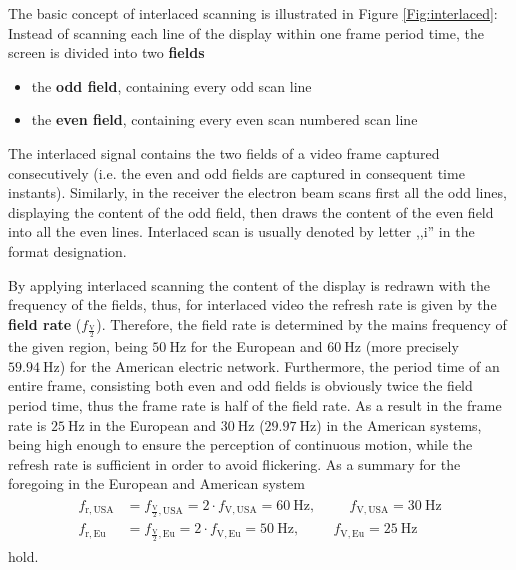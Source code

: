 The basic concept of interlaced scanning is illustrated in Figure \ref{Fig:interlaced}:
Instead of scanning each line of the display within one frame period time, the screen is divided into two \textbf{fields}
\begin{itemize}
\item the \textbf{odd field}, containing every odd scan line 
\item the \textbf{even field}, containing every even scan numbered scan line
\end{itemize}
The interlaced signal contains the two fields of a video frame captured consecutively (i.e. the even and odd fields are captured in consequent time instants).
Similarly, in the receiver the electron beam scans first all the odd lines, displaying the content of the odd field, then draws the content of the even field into all the even lines.
Interlaced scan is usually denoted by letter ,,i'' in the format designation.

By applying interlaced scanning the content of the display is redrawn with the frequency of the fields, thus, for interlaced video the refresh rate is given by the \textbf{field rate} ($f_{\frac{\mathrm{V}}{2}}$).
Therefore, the field rate is determined by the mains frequency of the given region, being $50~\mathrm{Hz}$ for the European and $60~\mathrm{Hz}$ (more precisely $59.94~\mathrm{Hz}$) for the American electric network.
Furthermore, the period time of an entire frame, consisting both even and odd fields is obviously twice the field period time, thus the frame rate is half of the field rate.
As a result in the frame rate is $25~\mathrm{Hz}$ in the European and $30~\mathrm{Hz}$ ($29.97~\mathrm{Hz}$) in the American systems, being high enough to ensure the perception of continuous motion, while the refresh rate is sufficient in order to avoid flickering.
As a summary for the foregoing in the European and American system 
\begin{align}
\begin{split}
f_{\mathrm{r,USA}} &= f_{\frac{\mathrm{V}}{2},\mathrm{USA}} = 2\cdot f_{\mathrm{V},\mathrm{USA}} = 60~\mathrm{Hz} , \hspace{1cm}  f_{\mathrm{V},\mathrm{USA}}= 30~\mathrm{Hz} \\
f_{\mathrm{r,Eu}} &= f_{\frac{\mathrm{V}}{2},\mathrm{Eu}} =  2\cdot f_{\mathrm{V},\mathrm{Eu}} = 50~\mathrm{Hz}, \hspace{1cm}  f_{\mathrm{V},\mathrm{Eu}}= 25~\mathrm{Hz}
\end{split}
\end{align}
hold.

